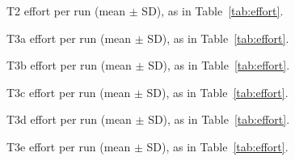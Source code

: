 \documentclass[11pt]{article}
\begin{document}
\begin{table}[h]
\centering\small
\caption{T2 effort per run (mean $\pm$ SD), as in Table~\ref{tab:effort}.}

\end{table}

\begin{table}[h]
\centering\small
\caption{T3a effort per run (mean $\pm$ SD), as in Table~\ref{tab:effort}.}

\end{table}

\begin{table}[h]
\centering\small
\caption{T3b effort per run (mean $\pm$ SD), as in Table~\ref{tab:effort}.}

\end{table}

\begin{table}[h]
\centering\small
\caption{T3c effort per run (mean $\pm$ SD), as in Table~\ref{tab:effort}.}

\end{table}

\begin{table}[h]
\centering\small
\caption{T3d effort per run (mean $\pm$ SD), as in Table~\ref{tab:effort}.}

\end{table}

\begin{table}[h]
\centering\small
\caption{T3e effort per run (mean $\pm$ SD), as in Table~\ref{tab:effort}.}

\end{table}
\end{document}
